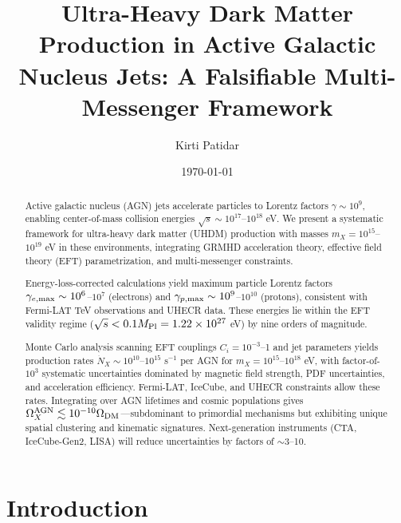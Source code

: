 \documentclass[twocolumn,superscriptaddress,prd,nofootinbib]{revtex4-2}
\begin{document}
\title{Ultra-Heavy Dark Matter Production in Active Galactic Nucleus Jets: A Falsifiable Multi-Messenger Framework}

\author{Kirti Patidar}

\date{\today}

\begin{abstract}
Active galactic nucleus (AGN) jets accelerate particles to Lorentz factors $\gamma \sim 10^9$, enabling center-of-mass collision energies $\sqrt{s} \sim 10^{17}$--$10^{18}$ eV. We present a systematic framework for ultra-heavy dark matter (UHDM) production with masses $m_X = 10^{15}$--$10^{19}$ eV in these environments, integrating GRMHD acceleration theory, effective field theory (EFT) parametrization, and multi-messenger constraints.

Energy-loss-corrected calculations yield maximum particle Lorentz factors $\gamma_{e,\rm max} \sim 10^6$--$10^7$ (electrons) and $\gamma_{p,\rm max} \sim 10^9$--$10^{10}$ (protons), consistent with Fermi-LAT TeV observations and UHECR data. These energies lie within the EFT validity regime ($\sqrt{s} < 0.1M_{\rm Pl} = 1.22 \times 10^{27}$ eV) by nine orders of magnitude.

Monte Carlo analysis scanning EFT couplings $C_i = 10^{-3}$--1 and jet parameters yields production rates $\dot{N}_X \sim 10^{10}$--$10^{15}$ s$^{-1}$ per AGN for $m_X = 10^{15}$--$10^{18}$ eV, with factor-of-$10^3$ systematic uncertainties dominated by magnetic field strength, PDF uncertainties, and acceleration efficiency. Fermi-LAT, IceCube, and UHECR constraints allow these rates. Integrating over AGN lifetimes and cosmic populations gives $\Omega_X^{\rm AGN} \lesssim 10^{-10}\Omega_{\rm DM}$---subdominant to primordial mechanisms but exhibiting unique spatial clustering and kinematic signatures. Next-generation instruments (CTA, IceCube-Gen2, LISA) will reduce uncertainties by factors of $\sim 3$--10.
\end{abstract}


\maketitle

\section{Introduction}
\label{sec:intro}
\end{document}
